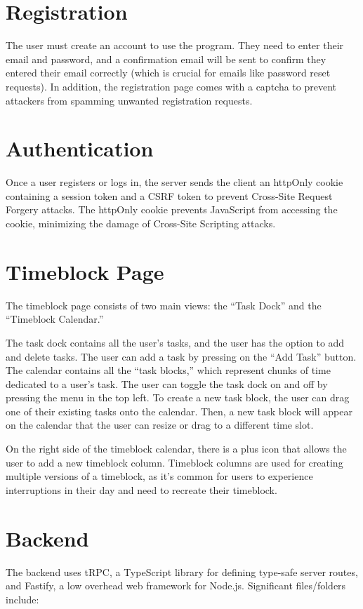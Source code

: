 \documentclass[notitlepage, 12pt]{report}
\begin{document}
\section*{Registration}
The user must create an account to use the program. They need to enter their email and password, and a confirmation email will be sent to confirm they entered their email correctly (which is crucial for emails like password reset requests). In addition, the registration page comes with a captcha to prevent attackers from spamming unwanted registration requests.

\section*{Authentication}
Once a user registers or logs in, the server sends the client an httpOnly cookie containing a session token and a CSRF token to prevent Cross-Site Request Forgery attacks. The httpOnly cookie prevents JavaScript from accessing the cookie, minimizing the damage of Cross-Site Scripting attacks.

\section*{Timeblock Page}
The timeblock page consists of two main views: the “Task Dock” and the “Timeblock Calendar.”

The task dock contains all the user’s tasks, and the user has the option to add and delete tasks. The user can add a task by pressing on the “Add Task” button. The calendar contains all the “task blocks,” which represent chunks of time dedicated to a user’s task. The user can toggle the task dock on and off by pressing the menu in the top left. To create a new task block, the user can drag one of their existing tasks onto the calendar. Then, a new task block will appear on the calendar that the user can resize or drag to a different time slot.

On the right side of the timeblock calendar, there is a plus icon that allows the user to add a new timeblock column. Timeblock columns are used for creating multiple versions of a timeblock, as it’s common for users to experience interruptions in their day and need to recreate their timeblock.

\section*{Backend}
The backend uses tRPC, a TypeScript library for defining type-safe server routes, and Fastify, a low overhead web framework for Node.js. Significant files/folders include:
\end{document}
